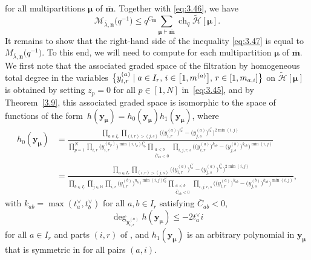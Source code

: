 \documentclass[10pt,a4paper]{amsart}
\numberwithin{equation}{section}
\DeclareMathOperator{\ch}{ch}
\begin{document}
\smash{$
\ch_q\tilde{ \Gamma}_{\bm{\mu}}/\tilde{\Gamma}_{\bm{\mu}}'
\leq\ch_q\tilde{\mathcal{H}}[\bm{\mu}]
$}
for all multipartitions $\bm{\mu}$ of $\overline{\mathbf{m}}$. Together with \eqref{eq:3.46}, we have
\begin{equation}\label{eq:3.47}
\mathcal{M}_{\overline{\lambda},\mathbf{n}}\bigl(q^{-1}\bigr)
\leq q^{C_{\overline{\mathbf{m}}}}\sum_{\bm{\mu}\vdash \overline{\mathbf{m}}}\ch_q\tilde{\mathcal{H}}[\bm{\mu}].
\end{equation}
It remains to show that the right-hand side of the inequality \eqref{eq:3.47} is equal to $M_{\overline{\lambda},\mathbf{n}}\bigl(q^{-1}\bigr)$. To this end, we will need to compute \smash{$\ch_q\tilde{ \mathcal{H}}[\bm{\mu}]$} for each multipartition $\bm{\mu}$ of $\overline{\mathbf{m}}$. We first note that the associated graded space of the filtration by homogeneous total degree in the variables $\smash{\bigl\{y_{i,r}^{(a)}}\mid a\in I_r,\, i\in\smash{\bigl[1,m^{(a)}\bigr]},\, r\in [1, m_{a,i}]\bigr\}$ on $\tilde{\mathcal{H}}[\bm{\mu}]$ is obtained by setting $z_p=0$ for all $p\in[1,N]$ in~\eqref{eq:3.45}, and by Theorem~\ref{3.9}, this associated graded space is isomorphic to the space of functions of the form~${
h(\mathbf{y}_{\bm{\mu}})
=h_0(\mathbf{y}_{\bm{\mu}})h_1(\mathbf{y}_{\bm{\mu}})}$,
where
\begin{align*}
 h_0(\mathbf{y}_{\bm{\mu}})
&=\frac{\prod_{a\in I_r}\prod_{(i,r)>(j,s)}\bigl(\bigl(y_{i,r}^{(a)}\bigr)^{t_a^{\vee}}-\bigl(y_{j,s}^{(a)}\bigr)^{t_a^{\vee}}) ^{2\min(i,j)}}{\prod_{p=1}^N\prod_{i,r}\bigl(y_{i,r} ^{(a_p)}\bigr)^{\min(i,i_p)t_{a_p}^{\vee}} \prod_{\substack{a<b\\ \overline{C}_{ab}<0}}\prod_{i,j,r,s}\bigl(\bigl(y_{i,r}^{(a)}\bigr)^{k_{ab}}-\bigl(y_{j,s}^{(b)}\bigr) ^{k_{ab}}\bigr)^{\min(i,j)}}\\
&=\frac{\prod_{a\in I_r}\prod_{(i,r)>(j,s)}\bigl(\bigl(y_{i,r}^{(a)}\bigr)^{t_a^{\vee}}-\bigl(y_{j,s}^{(a)}\bigr)^{t_a^{\vee}}\bigr) ^{2\min(i,j)}}{\prod_{b\in I_r}\prod_{j\in \mathbb{N}}\prod_{i,r}\bigl(y_{i,r}^{(b)}\bigr)^{n_{b,j}\min(i,j) t_b^{\vee}}\prod_{\substack{a<b\\ \overline{C}_{ab}<0}} \prod_{i,j,r,s}\bigl(\bigl(y_{i,r}^{(a)}\bigr)^{k_{ab}}-\bigl(y_{j,s}^{(b)}\bigr) ^{k_{ab}}\bigr)^{\min(i,j)}},
\end{align*}
with $k_{ab}=\max(t_a^{\vee},t_b^{\vee})$ for all $a,b\in I_r$ satisfying $\overline{C}_{ab}<0$,
\begin{equation}\label{eq:3.49}
\deg_{y_{i,r}^{(a)}}h(\mathbf{y}_{\bm{\mu}})
\leq-2t_a^{\vee}i
\end{equation}
for all $a\in I_r$ and parts $(i,r)$ of , and $h_1(\mathbf{y}_{\bm{\mu}})$ is an arbitrary polynomial in $\mathbf{y}_{\bm{\mu}}$ that is symmetric in  for all pairs $(a,i)$.
\end{document}
